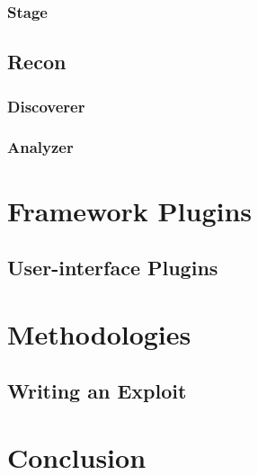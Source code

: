 \documentclass{report}
\begin{document}
        \subsection{Stage}
    \section{Recon}
        \subsection{Discoverer}
        \subsection{Analyzer}
\chapter{Framework Plugins}
    \section{User-interface Plugins}
\chapter{Methodologies}
    \section{Writing an Exploit}
\chapter{Conclusion}
\end{document}
